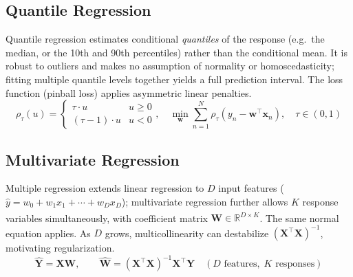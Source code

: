 \subsection{Quantile Regression}

\begin{tcbitemize}[ skin=sectionraster ]
    \tcbitem[title={Quantile Regression and the Pinball Loss}, raster multicolumn=6]
    Quantile regression estimates conditional \emph{quantiles} of the response (e.g.\ the median, or the 10th and 90th percentiles) rather than the conditional mean. It is robust to outliers and makes no assumption of normality or homoscedasticity; fitting multiple quantile levels together yields a full prediction interval. The loss function (pinball loss) applies asymmetric linear penalties.
    \tcblower
    \begin{equation}
        \rho_\tau(u) =
        \begin{cases}
            \tau \cdot u       & u \geq 0 \\
            (\tau - 1)\cdot u  & u < 0
        \end{cases},
        \quad
        \min_{\mathbf{w}} \sum_{n=1}^{N} \rho_\tau\!\left(y_n - \mathbf{w}^\top\mathbf{x}_n\right),
        \quad \tau \in (0,1)
    \end{equation}
\end{tcbitemize}

\subsection{Multivariate Regression}

\begin{tcbitemize}[ skin=sectionraster ]
    \tcbitem[title={Multiple and Multivariate Regression}, raster multicolumn=6]
    Multiple regression extends linear regression to $D$ input features ($\hat{y} = w_0 + w_1 x_1 + \cdots + w_D x_D$); multivariate regression further allows $K$ response variables simultaneously, with coefficient matrix $\mathbf{W} \in \mathbb{R}^{D \times K}$\textsuperscript{\cite[][pp.~86--97]{iiiCourseMachineLearning}}. The same normal equation applies. As $D$ grows, multicollinearity can destabilize $(\mathbf{X}^\top\mathbf{X})^{-1}$, motivating regularization.
    \tcblower
    \begin{equation}
        \hat{\mathbf{Y}} = \mathbf{X}\mathbf{W},
        \qquad
        \hat{\mathbf{W}} = (\mathbf{X}^\top\mathbf{X})^{-1}\mathbf{X}^\top\mathbf{Y}
        \quad (D \text{ features},\; K \text{ responses})
    \end{equation}
\end{tcbitemize}

